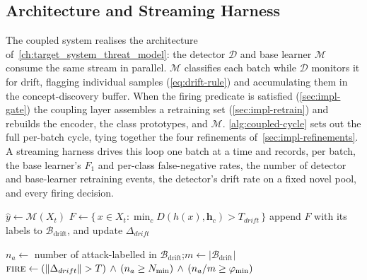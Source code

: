 \subsection{Architecture and Streaming Harness}
\label{sec:impl-harness}
The coupled system realises the architecture of~\cref{ch:target_system_threat_model}: the detector $\mathcal{D}$ and base learner $\mathcal{M}$ consume the same stream in parallel. $\mathcal{M}$ classifies each batch while $\mathcal{D}$ monitors it for drift, flagging individual samples (\cref{eq:drift-rule}) and accumulating them in the concept-discovery buffer. When the firing predicate is satisfied (\cref{sec:impl-gate}) the coupling layer assembles a retraining set (\cref{sec:impl-retrain}) and rebuilds the encoder, the class prototypes, and $\mathcal{M}$. \cref{alg:coupled-cycle} sets out the full per-batch cycle, tying together the four refinements of~\cref{sec:impl-refinements}. A streaming harness drives this loop one batch at a time and records, per batch, the base learner's $F_1$ and per-class false-negative rates, the number of detector and base-learner retraining events, the detector's drift rate on a fixed novel pool, and every firing decision.

\begin{algorithm}[H]
\DontPrintSemicolon
\SetInd{0.6em}{1.5em}
\caption{Coupled adaptation cycle for one stream batch (\textsc{AdaptiveDAdaptiveM}).}
\label{alg:coupled-cycle}
\BlankLine
\BlankLine

$\hat{y} \leftarrow \mathcal{M}(X_t)$\;
$F \leftarrow \{\, x \in X_t : \min_{c} D(h(x), \bm{h}_c) > T_{drift} \,\}$ 
append $F$ with its labels to $\mathcal{B}_{\mathrm{drift}}$, and update $\Delta_{drift}$ 
\BlankLine
\BlankLine

$n_a \leftarrow$ number of attack-labelled in $\mathcal{B}_{\mathrm{drift}}$;\quad $m \leftarrow |\mathcal{B}_{\mathrm{drift}}|$\;
$\textsc{fire} \leftarrow (\|\Delta_{drift}\| > T) \,\wedge\, (n_a \ge N_{\min}) \,\wedge\, (n_a/m \ge \varphi_{\min})$ 
\BlankLine
\BlankLine

\end{algorithm}


